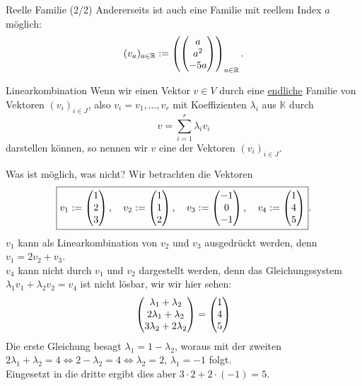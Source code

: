 \begin{Beispiel}
{Reelle Familie (2/2)}
Andererseits ist auch eine Familie mit reellem Index $a$ möglich:
\begin{equation*}
    (v_a)_{a\in\mathbb{R}}:=\left({\begin{pmatrix}a\\a^2\\-5a\end{pmatrix}}\right)_{a\in\mathbb{R}}.
\end{equation*}
\end{Beispiel}
\begin{Def}
{Linearkombination}
Wenn wir einen Vektor $v\in V$ durch eine \underline{endliche} Familie von Vektoren $(v_i)_{i\in J}$, also $v_i=v_1,...,v_r$ mit Koeffizienten $\lambda_i$ aus $\mathbb{K}$ durch
\begin{equation*}
    \boxed{v=\sum_{i=1}^r\lambda_i v_i}
\end{equation*}
darstellen können, so nennen wir $v$ eine  der Vektoren $(v_i)_{i\in J}$.
\end{Def}
\begin{Beispiel}[label=beisp:LinKombVektoren]
{Was ist möglich{,} was nicht?}
Wir betrachten die Vektoren
\begin{equation*}
    \boxed{v_1:=\begin{pmatrix}1\\2\\3\end{pmatrix},\quad v_2:=\begin{pmatrix}1\\1\\2\end{pmatrix},\quad v_3:=\begin{pmatrix}-1\\0\\-1\end{pmatrix},\quad v_4:=\begin{pmatrix}1\\4\\5\end{pmatrix}}.
\end{equation*}
$v_1$ kann als Linearkombination von $v_2$ und $v_3$ ausgedrückt werden, denn\\
$v_1=2v_2+v_3$.\\
$v_4$ kann nicht durch $v_1$ und $v_2$ dargestellt werden, denn das Gleichungssystem\\
$\lambda_1 v_1+\lambda_2 v_2=v_4$ ist nicht lösbar, wir wir hier sehen:
\begin{equation*}
    \begin{pmatrix}\lambda_1+\lambda_2\\2\lambda_1+\lambda_2\\3\lambda_2+2\lambda_2\end{pmatrix}=\begin{pmatrix}1\\4\\5\end{pmatrix}
\end{equation*}
Die erste Gleichung besagt $\lambda_1=1-\lambda_2$, woraus mit der zweiten\\$2\lambda_1+\lambda_2=4\Leftrightarrow 2-\lambda_2=4\Leftrightarrow\boxed{\lambda_2=2},\,\boxed{\lambda_1=-1}$ folgt.\\
Eingesetzt in die dritte ergibt dies aber $3\cdot2+2\cdot(-1)=5$. \Lightning
\end{Beispiel}
